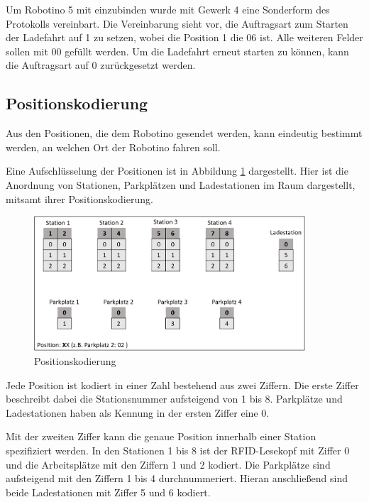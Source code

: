 Um Robotino 5 mit einzubinden wurde mit Gewerk 4 eine Sonderform des Protokolls vereinbart. Die Vereinbarung sieht vor, die Auftragsart zum Starten der Ladefahrt auf 1 zu setzen, wobei die Position 1 die 06 ist. Alle weiteren Felder sollen mit 00 gefüllt werden. Um die Ladefahrt erneut starten zu können, kann die Auftragsart auf 0 zurückgesetzt werden. 

\subsection{Positionskodierung}
\label{sec:Positionskodierung}

Aus den Positionen, die dem Robotino gesendet werden, kann eindeutig bestimmt werden, an welchen Ort der Robotino fahren soll. 

Eine Aufschlüsselung der Positionen ist in Abbildung \ref{fig:Positionskodierung} dargestellt. Hier ist die Anordnung von Stationen, Parkplätzen und Ladestationen im Raum dargestellt, mitsamt ihrer Positionskodierung. 

\begin{figure}[htb]
    \centering
    \includegraphics[width=0.9\textwidth]{Abbildungen/Positionskodierung.PNG}
    \caption{Positionskodierung}		
    \label{fig:Positionskodierung}
\end{figure}

Jede Position ist kodiert in einer Zahl bestehend aus zwei Ziffern. Die erste Ziffer beschreibt dabei die Stationsnummer aufsteigend von 1 bis 8. Parkplätze und Ladestationen haben als Kennung in der ersten Ziffer eine 0. 

Mit der zweiten Ziffer kann die genaue Position innerhalb einer Station spezifiziert werden. In den Stationen 1 bis 8 ist der RFID-Lesekopf mit Ziffer 0 und die Arbeitsplätze mit den Ziffern 1 und 2 kodiert. Die Parkplätze sind aufsteigend mit den Ziffern 1 bis 4 durchnummeriert. Hieran anschließend sind beide Ladestationen mit Ziffer 5 und 6 kodiert. 

